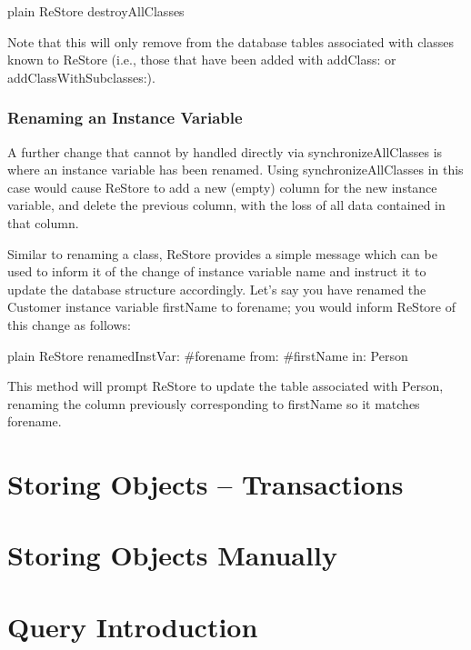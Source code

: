 \documentclass[10pt,twoside,english]{_support/latex/sbabook/sbabook}
\begin{document}
\begin{displaycode}{plain}
	ReStore destroyAllClasses
\end{displaycode}

Note that this will only remove from the database tables associated with classes known to ReStore (i.e., those that have been added with addClass: or addClassWithSubclasses:).
\subsection{Renaming an Instance Variable}
A further change that cannot by handled directly via synchronizeAllClasses is where an instance variable has been renamed. Using synchronizeAllClasses in this case would cause ReStore to add a new (empty) column for the new instance variable, and delete the previous column, with the loss of all data contained in that column.

Similar to renaming a class, ReStore provides a simple message which can be used to inform it of the change of instance variable name and instruct it to update the database structure accordingly. Let's say you have renamed the Customer instance variable firstName to forename; you would inform ReStore of this change as follows:

\begin{displaycode}{plain}
	ReStore renamedInstVar: #forename from: #firstName in: Person
\end{displaycode}

This method will prompt ReStore to update the table associated with Person, renaming the column previously corresponding to firstName so it matches forename.

\chapter{Storing Objects – Transactions}
\chapter{Storing Objects Manually}
\chapter{Query Introduction}






\backmatter

\end{document}

